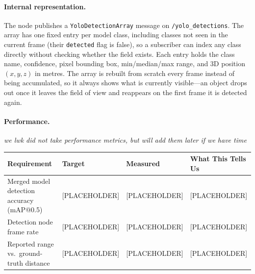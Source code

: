 \paragraph{Internal representation.} The node publishes a
\texttt{YoloDetectionArray} message on \texttt{/yolo\_detections}. The
array has one fixed entry per model class, including classes not seen
in the current frame (their \texttt{detected} flag is false), so a
subscriber can index any class directly without checking whether the
field exists. Each entry holds the class name, confidence, pixel
bounding box, min/median/max range, and 3D position $(x, y, z)$ in
metres. The array is rebuilt from scratch every frame instead of being
accumulated, so it always shows what is currently visible---an object
drops out once it leaves the field of view and reappears on the first
frame it is detected again.
 
\paragraph{Performance.} \textit{we lwk did not take performance metrics, but will add them later if we have time}
 
\begin{table}[h]
\centering
\small
\begin{tabular}{p{3.6cm} p{2.4cm} p{2.4cm} p{4.0cm}}
\hline
\textbf{Requirement} & \textbf{Target} & \textbf{Measured} &
\textbf{What This Tells Us} \\
\hline
Merged model detection accuracy (mAP@0.5) &
[PLACEHOLDER] & [PLACEHOLDER] & [PLACEHOLDER] \\
\hline
Detection node frame rate &
[PLACEHOLDER] & [PLACEHOLDER] & [PLACEHOLDER] \\
\hline
Reported range vs.\ ground-truth distance &
[PLACEHOLDER] & [PLACEHOLDER] & [PLACEHOLDER] \\
\hline
\end{tabular}
\end{table}
